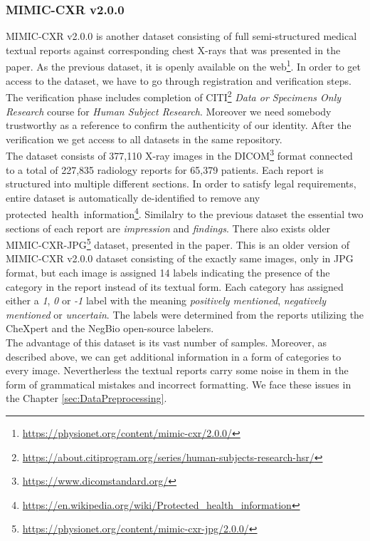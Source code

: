 \subsubsection{MIMIC-CXR v2.0.0}
MIMIC-CXR v2.0.0 is another dataset consisting of full semi-structured medical textual reports against corresponding chest X-rays that was presented in the \citet{cxr:johnson2019mimic} paper. As the previous dataset, it is openly available on the web\footnote[8]{\url{https://physionet.org/content/mimic-cxr/2.0.0/}}. In order to get access to the dataset, we have to go through registration and verification steps. The verification phase includes completion of CITI\footnote[9]{\url{https://about.citiprogram.org/series/human-subjects-research-hsr/}} \textit{Data or Specimens Only Research} course for \textit{Human Subject Research}. Moreover we need somebody trustworthy as a reference to confirm the authenticity of our identity. After the verification we get access to all datasets in the same repository.\\

The dataset consists of 377,110 X-ray images in the DICOM\footnote[10]{\url{https://www.dicomstandard.org/}} format connected to a total of 227,835 radiology reports for 65,379 patients. Each report is structured into multiple different sections. In order to satisfy legal requirements, entire dataset is automatically de-identified to remove any protected~health~information\footnote[11]{\url{https://en.wikipedia.org/wiki/Protected\_health\_information}}. Similalry to the previous dataset the essential two sections of each report are \textit{impression} and \textit{findings}. There also exists older MIMIC-CXR-JPG\footnote[12]{\url{https://physionet.org/content/mimic-cxr-jpg/2.0.0/}} dataset, presented in the \citet{cxr-jpg:johnson2019mimic} paper. This is an older version of MIMIC-CXR v2.0.0 dataset consisting of the exactly same images, only in JPG format, but each image is assigned 14 labels indicating the presence of the category in the report instead of its textual form. Each category has assigned either a \textit{1}, \textit{0} or \textit{-1} label with the meaning \textit{positively mentioned}, \textit{negatively mentioned} or \textit{uncertain}. The labels were determined from the reports utilizing the CheXpert\citep{irvin2019chexpert} and the NegBio\citep{peng2018negbio} open-source labelers.\\

The advantage of this dataset is its vast number of samples. Moreover, as described above, we can get additional information in a form of categories to every image. Nevertherless the textual reports carry some noise in them in the form of grammatical mistakes and incorrect formatting. We face these issues in the Chapter \ref{sec:DataPreprocessing}. 

